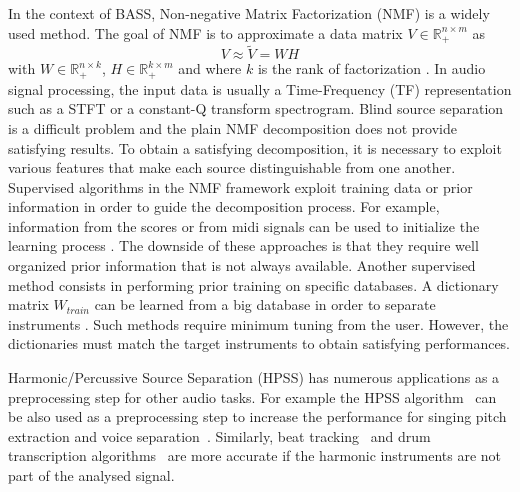 \documentclass{article}
\begin{document}
In the context of BASS, Non-negative Matrix Factorization (NMF) is a widely used method. The goal of NMF is to approximate a data matrix $V \in \mathbb{R}_{+}^{n \times m} $ as 
\begin{equation}\label{modelNMF}
V \approx \tilde{V} = WH
\end{equation}
with $W \in \mathbb{R}_{+}^{n \times k}$, $H \in \mathbb{R}_{+}^{k \times m}$ and where $k$ is the rank of factorization \cite{lee99}. In audio signal processing, the input data is usually a Time-Frequency (TF) representation such as a STFT or a constant-Q transform spectrogram. Blind source separation is a difficult problem and the plain NMF decomposition does not provide satisfying results. To obtain a satisfying decomposition, it is necessary to exploit various features that make each source distinguishable from one another. 
Supervised algorithms in the NMF framework exploit training data or prior information in order to guide the decomposition process. For example, information from the scores or from midi signals can be used to initialize the learning process \cite{EwertM12}. The downside of these approaches is that they require well organized prior information that is not always available. Another supervised method consists in performing prior training on specific databases. A dictionary matrix $W_{train}$ can be learned from a big database in order to separate instruments \cite{jaureguiberry2011adaptation,wudrum}. Such methods require minimum tuning from the user. However, the dictionaries must match the target instruments to obtain satisfying performances. 


Harmonic/Percussive Source Separation (HPSS) has numerous applications as a preprocessing step for other audio tasks. For example the HPSS algorithm~\cite{fitzgerald2010harmonic} can be also used as a preprocessing step to increase the performance for singing pitch extraction and voice separation~\cite{hsu2012tandem}. 
Similarly, beat tracking~\cite{ellis2007beat} and drum transcription algorithms~\cite{paulus2005drum} are more accurate if the harmonic instruments are not part of the analysed signal. 
\end{document}
